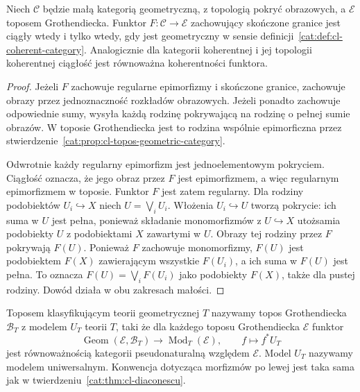 \begin{stwierdzenie}\label{cat:prop:cl-continuous-geometric}
Niech $\mathcal C$ będzie małą kategorią geometryczną, z topologią pokryć obrazowych, a $\mathcal E$ toposem Grothendiecka. Funktor $F:\mathcal C\to\mathcal E$ zachowujący skończone granice jest ciągły wtedy i tylko wtedy, gdy jest geometryczny w sensie definicji~\ref{cat:def:cl-coherent-category}. Analogicznie dla kategorii koherentnej i jej topologii koherentnej ciągłość jest równoważna koherentności funktora.
\end{stwierdzenie}
\begin{proof}
Jeżeli $F$ zachowuje regularne epimorfizmy i skończone granice, zachowuje obrazy przez jednoznaczność rozkładów obrazowych. Jeżeli ponadto zachowuje odpowiednie sumy, wysyła każdą rodzinę pokrywającą na rodzinę o pełnej sumie obrazów. W toposie Grothendiecka jest to rodzina wspólnie epimorficzna przez stwierdzenie~\ref{cat:prop:cl-topos-geometric-category}.

Odwrotnie każdy regularny epimorfizm jest jednoelementowym pokryciem. Ciągłość oznacza, że jego obraz przez $F$ jest epimorfizmem, a więc regularnym epimorfizmem w toposie. Funktor $F$ jest zatem regularny. Dla rodziny podobiektów $U_i\hookrightarrow X$ niech $U=\bigvee_iU_i$. Włożenia $U_i\hookrightarrow U$ tworzą pokrycie: ich suma w $U$ jest pełna, ponieważ składanie monomorfizmów z $U\hookrightarrow X$ utożsamia podobiekty $U$ z podobiektami $X$ zawartymi w $U$. Obrazy tej rodziny przez $F$ pokrywają $F(U)$. Ponieważ $F$ zachowuje monomorfizmy, $F(U)$ jest podobiektem $F(X)$ zawierającym wszystkie $F(U_i)$, a ich suma w $F(U)$ jest pełna. To oznacza $F(U)=\bigvee_iF(U_i)$ jako podobiekty $F(X)$, także dla pustej rodziny. Dowód działa w obu zakresach małości.
\end{proof}

\begin{definicja}\label{cat:def:cl-classifying-topos}
Toposem klasyfikującym teorii geometrycznej $T$ nazywamy topos Grothendiecka $\mathcal B_T$ z modelem $U_T$ teorii $T$, taki że dla każdego toposu Grothendiecka $\mathcal E$ funktor
\[
 \operatorname{Geom}(\mathcal E,\mathcal B_T)
 \longrightarrow \operatorname{Mod}_T(\mathcal E),
 \qquad f\longmapsto f^*U_T
\]
jest równoważnością kategorii pseudonaturalną względem $\mathcal E$. Model $U_T$ nazywamy modelem uniwersalnym. Konwencja dotycząca morfizmów po lewej jest taka sama jak w twierdzeniu~\ref{cat:thm:cl-diaconescu}.
\end{definicja}

